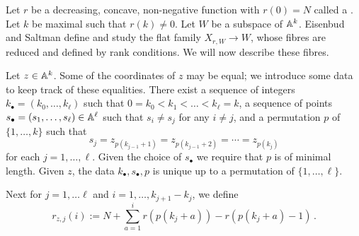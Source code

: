 \documentclass{article} %
\begin{document}
Let $ r $ be a decreasing, concave, non-negative function with $r(0) = N$ called a .  Let $k $ be maximal such that $ r(k) \ne 0 $.
% 
Let $ W$ be a subspace of $ \AA^k$. Eisenbud and Saltman define and study the flat family $ X_{r,W} \rightarrow W$, whose fibres are reduced and defined by rank conditions. We will now describe these fibres.

Let $ z \in \AA^k$. Some of the coordinates of $z$ may be equal; we introduce some data to keep track of these equalities. There exist a sequence of integers $k_\bullet = (k_0,\dots,k_\ell)$ such that $ 0=k_0< k_1< \dots < k_\ell = k $, a sequence of points $s_\bullet = (s_1, \dots, s_\ell )\in\AA^\ell$ such that $s_i\ne s_j$ for any $i\ne j$, and a permutation  $ p $ of $ \{1, \dots, k\}$ such that 
$$ s_j = z_{p(k_{j-1}+1)} = z_{p(k_{j-1} + 2)} =  \cdots = z_{p(k_j)}$$ 
for each $j = 1,\dots,\ell$. 
Given the choice of $ s_\bullet$ we require that $ p $ is of minimal length. 
Given $z$, the data $k_\bullet, s_\bullet, p$ is unique up to a permutation of $ \{1, \dots, \ell\}$.
% 
% 

Next for $ j = 1, \dots \ell $ and $ i = 1, \dots, k_{j+1} - k_j$, we define
$$
    r_{z,j}(i):= N + \sum_{a = 1}^i r(p(k_j + a)) - r(p(k_j +a) - 1)  \, . 
$$
\end{document}
